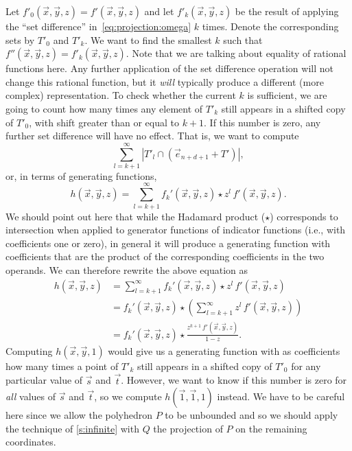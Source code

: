 Let $f'_0(\vec x, \vec y, z) = f'(\vec x, \vec y, z)$ and
let $f'_k(\vec x, \vec y, z)$ be the result of applying
the ``set difference'' in~\eqref{eq:projection:omega} $k$ times.
Denote the corresponding sets by $T'_0$ and $T'_k$.
We want to find the smallest $k$ such that
$f''(\vec x, \vec y, z) = f'_k(\vec x, \vec y, z)$.
Note that we are talking about equality of rational functions here.
Any further application of the set difference operation will
not change this rational function, but it {\em will\/} typically
produce a different (more complex) representation.
To check whether the current $k$ is sufficient, we are going to
count how many times any element of $T'_k$ still appears in a
shifted copy of $T'_0$, with shift greater than or equal to $k+1$.
If this number is zero, any further set difference will have no effect.
That is, we want to compute
$$
\sum_{l=k+1}^\infty
	\left|
	    T'_l \cap \left(\vec e_{n+d+1} + T' \right)
	\right|
,
$$
or, in terms of generating functions,
$$
h(\vec x, \vec y, z) = \sum_{l=k+1}^\infty
	f_k'(\vec x, \vec y, z) \star z^l \, f'(\vec x, \vec y, z)
.
$$
We should point out here that while the Hadamard product ($\star$)
corresponds to intersection when applied to generator functions
of indicator functions (i.e., with coefficients one or zero),
in general it will produce a generating function with coefficients
that are the product of the corresponding coefficients in the two
operands.
We can therefore rewrite the above equation as
$$
\begin{aligned}
h(\vec x, \vec y, z) & = \sum_{l=k+1}^\infty
	f_k'(\vec x, \vec y, z) \star z^l \, f'(\vec x, \vec y, z)
\\
& = f_k'(\vec x, \vec y, z) \star
	\left(
		\sum_{l=k+1}^\infty  z^l \, f'(\vec x, \vec y, z)
	\right)
\\
& = f_k'(\vec x, \vec y, z) \star
\frac{z^{k+1} \, f'(\vec x, \vec y, z)}{1-z}
.
\end{aligned}
$$
Computing $h(\vec x, \vec y, 1)$ would give us a generating
function with as coefficients how many times a point of $T'_k$
still appears in a shifted copy of $T'_0$ for any particular
value of $\vec s$ and $\vec t$.
However, we want to know if this number is zero for {\em all\/}
values of $\vec s$ and $\vec t$, so we compute $h(\vec 1, \vec 1, 1)$
instead.  We have to be careful here since we allow the polyhedron
$P$ to be unbounded and so we should apply the technique
of \autoref{s:infinite} with $Q$ the projection of $P$ on
the remaining coordinates.

